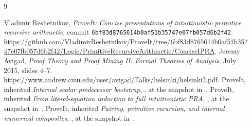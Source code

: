 \documentclass[11pt,a4paper]{article}
\theoremstyle{definition}
\begin{document}
\begin{thebibliography}{9}\raggedright
{}
Vladimir Reshetnikov, \emph{ProveIt: Concise presentations of intuitionistic
primitive recursive arithmetic}, commit
\texttt{6bf83d8765614b0af51b35747e07fb057d6b2f42}.
\url{https://github.com/VladimirReshetnikov/ProveIt/tree/6bf83d8765614b0af51b35747e07fb057d6b2f42/Logic/PrimitiveRecursiveArithmetic/ConciseIPRA}.
Jeremy Avigad, \emph{Proof Theory and Proof Mining II: Formal Theories
of Analysis}, July 2015, slides 4--7.
\url{https://www.andrew.cmu.edu/user/avigad/Talks/helsinki/helsinki2.pdf}.
ProveIt, inherited \emph{Internal scalar predecessor bootstrap},
,
at the snapshot in~\cite{upstream}.
ProveIt, inherited \emph{From literal-equation induction to full
intuitionistic PRA},
,
at the snapshot in~\cite{upstream}.
ProveIt, inherited \emph{Pairing, primitive recursion, and internal
numerical composites},
,
at the snapshot in~\cite{upstream}.
\end{thebibliography}
\end{document}
